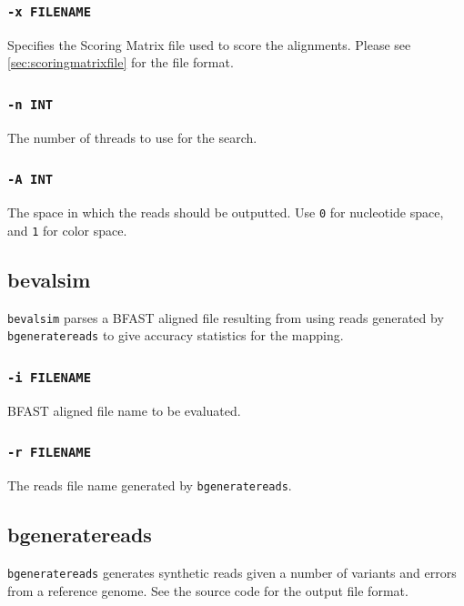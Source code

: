 \documentclass[a4paper,12pt]{book}
\newcommand{\TT}[1]{{\tt #1}} %
\newcommand{\BAF}{BFAST aligned file} %
\begin{document}
\subsubsection{\TT{-x FILENAME}}
Specifies the Scoring Matrix file used to score the alignments.
Please see \autoref{sec:scoringmatrixfile} for the file format.

\subsubsection{\TT{-n INT}}
The number of threads to use for the search.

\subsubsection{\TT{-A INT}}
The space in which the reads should be outputted.
Use \TT{0} for nucleotide space, and \TT{1} for color space.

\subsection{bevalsim}
\label{sec:bevalsim}
\TT{bevalsim} parses a \BAF{} resulting from using reads generated by \TT{bgeneratereads} to give accuracy statistics for the mapping.

\subsubsection{\TT{-i FILENAME}}
\BAF{} name to be evaluated.

\subsubsection{\TT{-r FILENAME}}
The reads file name generated by \TT{bgeneratereads}.

\subsection{bgeneratereads}
\label{sec:bgeneratereads}
\TT{bgeneratereads} generates synthetic reads given a number of variants and errors from a reference genome.
See the source code for the output file format.
\end{document}
